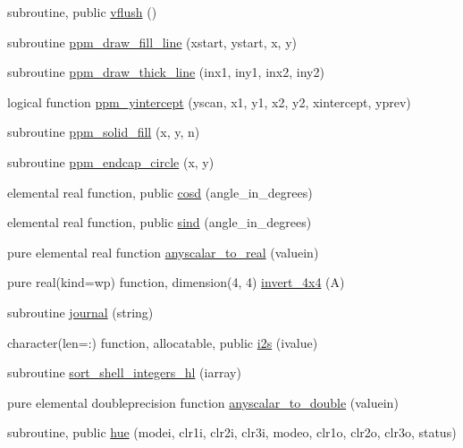 \begin{DoxyCompactItemize}
\item 
subroutine, public \mbox{\hyperlink{namespacem__pixel_ae74cf11194379dbf13069a61b06589a2}{vflush}} ()
\item 
subroutine \mbox{\hyperlink{namespacem__pixel_a6f75bc951acd07267e0841ca5985d8b7}{ppm\+\_\+draw\+\_\+fill\+\_\+line}} (xstart, ystart, x, y)
\item 
subroutine \mbox{\hyperlink{namespacem__pixel_a1629b7134d0ea4b0f301ca23df764b8e}{ppm\+\_\+draw\+\_\+thick\+\_\+line}} (inx1, iny1, inx2, iny2)
\item 
logical function \mbox{\hyperlink{namespacem__pixel_a4924b3a5033acb74a4f4df60a4ba21eb}{ppm\+\_\+yintercept}} (yscan, x1, y1, x2, y2, xintercept, yprev)
\item 
subroutine \mbox{\hyperlink{namespacem__pixel_aedaf33a27e9899da22c2497aff2af903}{ppm\+\_\+solid\+\_\+fill}} (x, y, n)
\item 
subroutine \mbox{\hyperlink{namespacem__pixel_aede24c612504a3e416840e6242c2d8fb}{ppm\+\_\+endcap\+\_\+circle}} (x, y)
\item 
elemental real function, public \mbox{\hyperlink{namespacem__pixel_a312c40bfbd03b2bbe6f85bc5efca6ce3}{cosd}} (angle\+\_\+in\+\_\+degrees)
\item 
elemental real function, public \mbox{\hyperlink{namespacem__pixel_a3ef23ce0230c47b30cb627ebd439daae}{sind}} (angle\+\_\+in\+\_\+degrees)
\item 
pure elemental real function \mbox{\hyperlink{namespacem__pixel_a79feab3c00d124d3f3396ad87ed4940e}{anyscalar\+\_\+to\+\_\+real}} (valuein)
\item 
pure real(kind=wp) function, dimension(4, 4) \mbox{\hyperlink{namespacem__pixel_a630b892544962a88d91b1ab983dc5649}{invert\+\_\+4x4}} (A)
\item 
subroutine \mbox{\hyperlink{namespacem__pixel_ac39c9efa849915aff58657e2df03fe3c}{journal}} (string)
\item 
character(len=\+:) function, allocatable, public \mbox{\hyperlink{namespacem__pixel_a4d23e0d3f4de5b3652a4eb5a61d7dc8d}{i2s}} (ivalue)
\item 
subroutine \mbox{\hyperlink{namespacem__pixel_a4396c3ff36a080fbbfa859348203d0c7}{sort\+\_\+shell\+\_\+integers\+\_\+hl}} (iarray)
\item 
pure elemental doubleprecision function \mbox{\hyperlink{namespacem__pixel_a18d90bca3489d1280c4326e51b5cb7b3}{anyscalar\+\_\+to\+\_\+double}} (valuein)
\item 
subroutine, public \mbox{\hyperlink{namespacem__pixel_aa76d2ac385f3ad0bc2b555cc14b7d53f}{hue}} (modei, clr1i, clr2i, clr3i, modeo, clr1o, clr2o, clr3o, status)

\end{DoxyCompactItemize}
